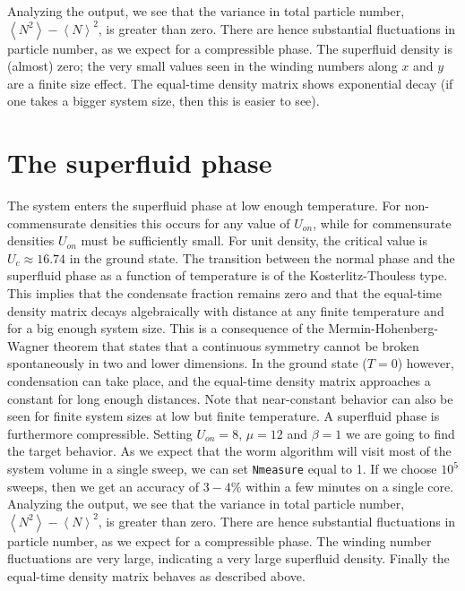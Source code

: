 \documentclass[pra,aps,showpacs,groupedaddress,superscriptaddress,twocolumn,toc=flat]{revtex4-1}
\begin{document}
Analyzing the output, we see that the variance in total particle number, $\left< N^2 \right> - \left< N \right>^2$, is greater than zero. There are hence substantial fluctuations in particle number, as we expect for a compressible phase. The superfluid density is (almost) zero; the very small values seen in the winding numbers along $x$ and $y$ are a finite size effect.  The equal-time density matrix shows exponential decay (if one takes a bigger system size, then this is easier to see). 


\section{The superfluid phase}
The system enters the superfluid phase at low enough temperature. For non-commensurate densities this occurs for any value of $U_{on}$, while for commensurate densities $U_{on}$ must be sufficiently small. For unit density, the critical value is $U_c \approx 16.74$ in the ground state. 
The transition between the normal phase and the superfluid phase as a function of temperature is of the Kosterlitz-Thouless type. This implies that the condensate fraction remains zero and that the equal-time density matrix decays algebraically with distance at any finite temperature and for a big enough system size. This is a consequence of the Mermin-Hohenberg-Wagner theorem that states that a continuous symmetry cannot be broken spontaneously in two and lower dimensions. In the ground state ($T = 0$) however, condensation can take place, and the equal-time density matrix approaches a constant for long enough distances. Note that near-constant behavior can also be seen for finite system sizes at low but finite temperature.  A superfluid phase is furthermore compressible. Setting $U_{on} = 8$, $\mu = 12$ and $\beta = 1$ we are going to find the target behavior. As we expect that the worm algorithm will visit most of the system volume in a single sweep, we can set \texttt{Nmeasure} equal to 1. If we choose $10^5$ sweeps, then we get an accuracy of $3-4\%$ within a few minutes on a single core. \\

Analyzing the output, we see that the variance in total particle number, $\left< N^2 \right> - \left< N \right>^2$, is greater than zero. There are hence substantial fluctuations in particle number, as we expect for a compressible phase. 
The winding number fluctuations are very large, indicating a very large superfluid density. Finally the  equal-time density matrix behaves as described above.
\end{document}

